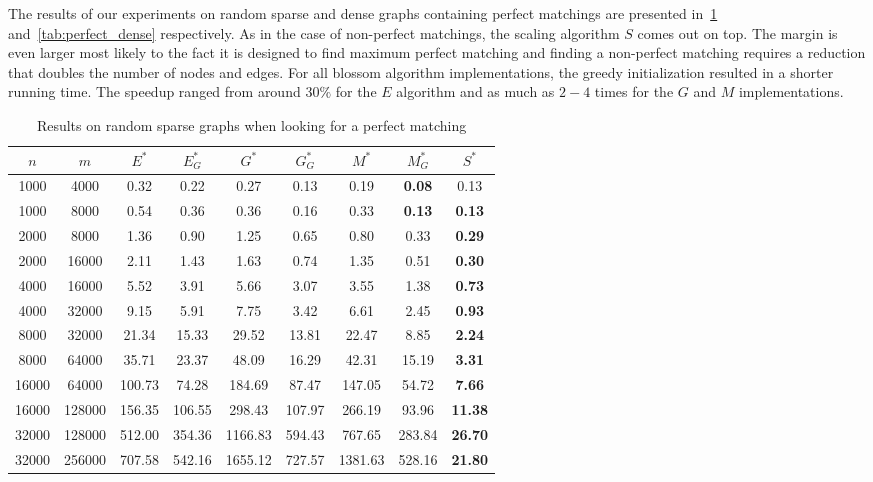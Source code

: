The results of our experiments on random sparse and dense graphs containing perfect matchings are presented in~\ref{tab:perfect_sparse} and~\ref{tab:perfect_dense} respectively. As in the case of non-perfect matchings, the scaling algorithm $S$ comes out on top. The margin is even larger most likely to the fact it is designed to find maximum perfect matching and finding a non-perfect matching requires a reduction that doubles the number of nodes and edges. For all blossom algorithm implementations, the greedy initialization resulted in a shorter running time. The speedup ranged from around $30\%$ for the $E$ algorithm and as much as $2-4$ times for the $G$ and $M$ implementations.

\begin{table}
\centering
{} {
\begin{tabular}{
cc|ccccccc}
$n$ & $m$ & $E^*$ & $E^*_G$ & $G^*$ & $G^*_G$ & $M^*$ & $M^*_G$ & $S^*$ \\
\hline
1000 & 4000 & 0.32 & 0.22 & 0.27 & 0.13 & 0.19 & \textbf{0.08} & 0.13 \\
1000 & 8000 & 0.54 & 0.36 & 0.36 & 0.16 & 0.33 & \textbf{0.13} & \textbf{0.13} \\
2000 & 8000 & 1.36 & 0.90 & 1.25 & 0.65 & 0.80 & 0.33 & \textbf{0.29} \\
2000 & 16000 & 2.11 & 1.43 & 1.63 & 0.74 & 1.35 & 0.51 & \textbf{0.30} \\
4000 & 16000 & 5.52 & 3.91 & 5.66 & 3.07 & 3.55 & 1.38 & \textbf{0.73} \\
4000 & 32000 & 9.15 & 5.91 & 7.75 & 3.42 & 6.61 & 2.45 & \textbf{0.93} \\
8000 & 32000 & 21.34 & 15.33 & 29.52 & 13.81 & 22.47 & 8.85 & \textbf{2.24} \\
8000 & 64000 & 35.71 & 23.37 & 48.09 & 16.29 & 42.31 & 15.19 & \textbf{3.31} \\
16000 & 64000 & 100.73 & 74.28 & 184.69 & 87.47 & 147.05 & 54.72 & \textbf{7.66} \\
16000 & 128000 & 156.35 & 106.55 & 298.43 & 107.97 & 266.19 & 93.96 & \textbf{11.38} \\
32000 & 128000 & 512.00 & 354.36 & 1166.83 & 594.43 & 767.65 & 283.84 & \textbf{26.70} \\
32000 & 256000 & 707.58 & 542.16 & 1655.12 & 727.57 & 1381.63 & 528.16 & \textbf{21.80} \\
\end{tabular}
}
\caption{Results on random sparse graphs when looking for a perfect matching}\label{tab:perfect_sparse}
\end{table}

